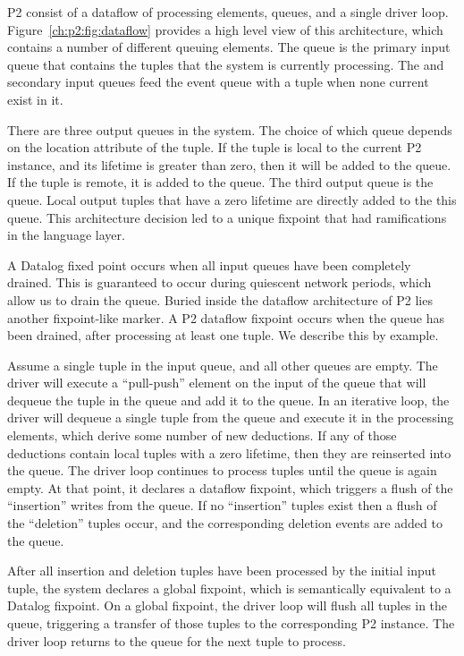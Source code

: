 P2 consist of a dataflow of processing elements, queues, and a single driver
loop.  Figure~\ref{ch:p2:fig:dataflow} provides a high level view of this
architecture, which contains a number of different queuing elements.  The
 queue is the primary input queue that contains the tuples that the
system is currently processing.  The  and  secondary
input queues feed the event queue with a tuple when none current exist in it.

There are three output queues in the system.  The choice of which queue depends
on the location attribute of the tuple.  If the tuple is local to the current
P2 instance, and its lifetime is greater than zero, then it will be added to
the  queue.  If the tuple is remote, it is added to the  queue.  The third output queue is the  queue.  Local output
tuples that have a zero lifetime are directly added to the this queue.  This
architecture decision led to a unique fixpoint that had ramifications in the
\OVERLOG language layer.

A Datalog fixed point occurs when all input queues have been completely drained.
This is guaranteed to occur during quiescent network periods, which allow
us to drain the  queue. Buried inside the dataflow architecture of
P2 lies another fixpoint-like marker. A P2 dataflow fixpoint occurs when the
 queue has been drained, after processing at least one tuple. We describe
this by example.

Assume a single tuple in the  input queue, and all other queues are
empty.  The driver will execute a ``pull-push'' element on the input of the
 queue that will dequeue the tuple in the  queue and add
it to the  queue.  In an iterative loop, the driver will dequeue a
single tuple from the  queue and execute it in the processing
elements, which derive some number of new deductions.  If any of those
deductions contain local tuples with a zero lifetime, then they are reinserted
into the  queue.  The driver loop continues to process 
tuples until the  queue is again empty.  At that point, it declares a
dataflow fixpoint, which triggers a flush of the ``insertion'' writes from the
 queue.  If no ``insertion'' tuples exist then a flush of the
``deletion'' tuples occur, and the corresponding deletion events are added to
the  queue.  

After all insertion and deletion tuples have been processed by the initial
 input tuple, the system declares a global fixpoint, which is
semantically equivalent to a Datalog fixpoint.  On a global fixpoint, the
driver loop will flush all tuples in the  queue, triggering a
transfer of those tuples to the corresponding P2 instance.  The driver loop
returns to the  queue for the next tuple to process.


